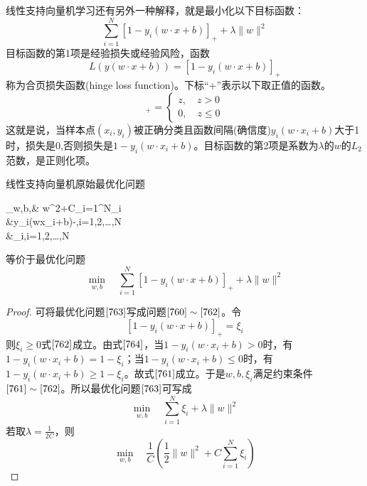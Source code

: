 线性支持向量机学习还有另外一种解释，就是最小化以下目标函数：
\begin{equation}
	\sum_{i=1}^{N}[1-y_i(w\cdot x+b)]_+ +\lambda\lVert w\rVert ^2
\end{equation}
目标函数的第1项是经验损失或经验风险，函数
\begin{equation}
	L(y(w\cdot x+b))=[1-y_i(w\cdot x+b)]_+
\end{equation}
称为合页损失函数(hinge loss function)。下标“+”表示以下取正值的函数。
\begin{equation}
	[z]_+=\begin{cases}
		z,\quad z>0\\
		0,\quad z\leqslant 0
	\end{cases}
\end{equation}
这就是说，当样本点$(x_i,y_i)$被正确分类且函数间隔(确信度)$y_i(w\cdot x_i+b)$大于1时，损失是0,否则损失是$1-y_i(w\cdot x_i+b)$。目标函数的第2项是系数为$\lambda$的$w$的$L_2$范数，是正则化项。
\begin{theorem}{}{}
	线性支持向量机原始最优化问题
	\begin{flalign}
	\label{760}
		\limits_{w,b,\xi}\quad & \lVert w\rVert^2+C\sum_{i=1}^{N}\xi_i\\
		\label{761}
		\quad &y_i(w\cdot x_i+b)-\xi,\quad i=1,2,\dots,N\\
		\label{762}
		&\xi_i,\quad i=1,2,\dots,N
	\end{flalign}
	等价于最优化问题
	\begin{equation}
	\label{763}
		\mathop{\mathrm{min}}\limits_{w,b}\quad 	\sum_{i=1}^{N}[1-y_i(w\cdot x+b)]_+ +\lambda\lVert w\rVert ^2
	\end{equation}
\end{theorem}
\begin{proof}{}{}
	可将最优化问题$\ref{763}$写成问题$\ref{760}\sim \ref{762}$。令
	\begin{equation}
	\label{764}
		[1-y_i(w\cdot x+b)]_+=\xi_i
	\end{equation}
	则$\xi_i\geqslant 0$式$\ref{762}$成立。由式$\ref{764}$，当$1-y_i(w\cdot x_i+b)>0$时，有$1-y_i(w\cdot x_i+b)=1-\xi_i$；当$1-y_i(w\cdot x_i+b)\leqslant 0$时，有$1-y_i(w\cdot x_i+b)\geqslant 1-\xi_i$。故式$\ref{761}$成立。于是$w,b,\xi_i$满足约束条件$\ref{761}\sim \ref{762}$。所以最优化问题$\ref{763}$可写成
	\begin{equation}
		\mathop{\mathrm{min}}\limits_{w,b}\quad 	\sum_{i=1}^{N}\xi_i +\lambda\lVert w\rVert ^2
	\end{equation}
	若取$\lambda=\frac{1}{2C}$，则
	\begin{equation}
		\mathop{\mathrm{min}}\limits_{w,b}\quad 	\frac{1}{C}\left(\frac{1}{2}\lVert w\rVert ^2+C\sum_{i=1}^{N}\xi_i \right)
	\end{equation}
\end{proof}